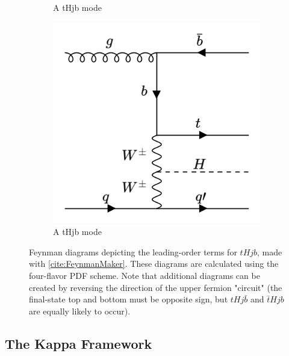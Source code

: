 \begin{figure}[htp]
\begin{subfigure}[b]{0.3\textwidth}
         \caption{A tHjb mode}
         \label{fig:tHjb4}
     \end{subfigure}
     \hfill
         \begin{subfigure}[b]{0.3\textwidth}
         \centering
         \includegraphics[width=\textwidth]{figures/theory_chapter/tHjb5.png}
         \caption{A tHjb mode}
         \label{fig:tHjb5}
     \end{subfigure}
  \label{fig:tHjbmodes}
  \caption{Feynman diagrams depicting the leading-order terms for $tHjb$, made with \ref{cite:FeynmanMaker}. These diagrams are calculated using the four-flavor PDF scheme. Note that additional diagrams can be created by reversing the direction of the upper fermion "circuit" (the final-state top and bottom must be opposite sign, but $tHj\bar{b}$ and $\bar{t}Hjb$ are equally likely to occur).}  
\end{figure}

\subsection{The Kappa Framework} \label{sec:kappaFW}

